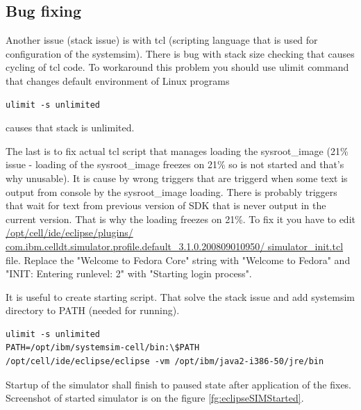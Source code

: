 \subsection{Bug fixing}

\par
Another issue (stack issue) is with tcl (scripting language that is used for configuration of the systemsim).
There is bug with stack size checking that causes cycling of tcl code.
To workaround this problem you should use ulimit command that changes default environment of Linux programs

\begin{verbatim}
ulimit -s unlimited
\end{verbatim}

causes that stack is unlimited.

\par
The last is to fix actual tcl script that manages loading the sysroot\_image (21\% issue - loading of the sysroot\_image freezes on 21\% so is not started and that's why unusable).
It is cause by wrong triggers that are triggerd when some text is output from console by the sysroot\_image loading.
There is probably triggers that wait for text from previous version of SDK that is never output in the current version.
That is why the loading freezes on 21\%.
To fix it you have to edit \url{/opt/cell/ide/eclipse/plugins/ com.ibm.celldt.simulator.profile.default_3.1.0.200809010950/ simulator_init.tcl} file.
Replace the "Welcome to Fedora Core" string with "Welcome to Fedora" and "INIT: Entering runlevel: 2" with "Starting login process".

It is useful to create starting script. That solve the stack issue and add systemsim directory to PATH (needed for running).

\begin{verbatim}
ulimit -s unlimited
PATH=/opt/ibm/systemsim-cell/bin:\$PATH
/opt/cell/ide/eclipse/eclipse -vm /opt/ibm/java2-i386-50/jre/bin
\end{verbatim}

Startup of the simulator shall finish to paused state after application of the fixes.
Screenshot of started simulator is on the figure \ref{fg:eclipseSIMStarted}.

